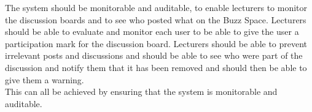 \documentclass[12pt, a4paper]{article}
\begin{document}
The system should be monitorable and auditable, to enable lecturers to monitor the discussion boards and to see who posted what on the Buzz Space. Lecturers should be able to evaluate and monitor each user to be able to give the user a participation mark for the discussion board.  Lecturers should be able to prevent irrelevant posts and discussions and should be able to see who were part of the discussion and notify them that it has been removed and should then be able to give them a warning.\\

 This can all be achieved by ensuring that the system is monitorable and auditable.
\end{document}
